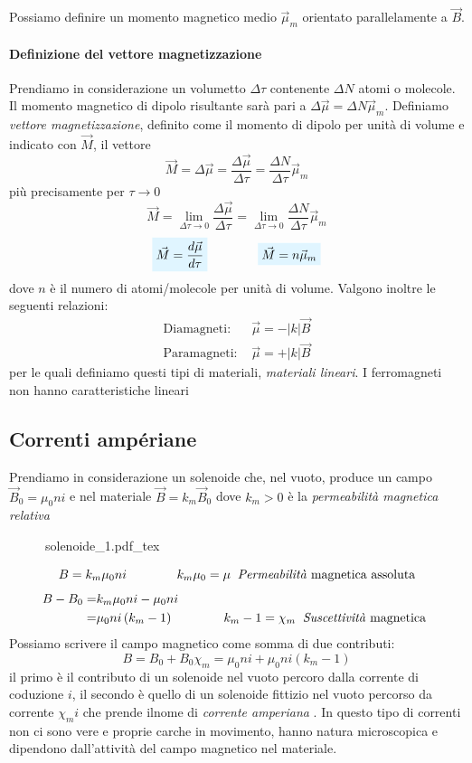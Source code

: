 \documentclass[x11names]{report}
\newcommand{\incfig}[1]{%
	{#1.pdf_tex}
}
\newcommand{\viola}[1]{%
	\colorbox{myblue}{$\displaystyle #1$}
}
\begin{document}
Possiamo definire un momento magnetico medio \(\vec{\mu}_m\) orientato parallelamente a \(\vec{B}\).

\paragraph{Definizione del vettore magnetizzazione}
Prendiamo in considerazione un volumetto \(\Delta\tau\) contenente \(\Delta N\) atomi o molecole. Il momento magnetico di dipolo risultante sarà pari a \(\Delta\vec{\mu} = \Delta N \vec{\mu}_m\). Definiamo \textit{vettore magnetizzazione}, definito come il momento di dipolo per unità di volume e indicato con \(\vec{M}\), il vettore
\[
\vec{M} = \Delta\vec{\mu} = \frac{\Delta \vec{\mu}}{\Delta\tau} =\frac{\Delta N}{\Delta\tau} \vec{\mu}_m
\]
più precisamente per \(\tau \to 0\)
\[
\vec{M} = \lim_{\Delta\tau \to 0}\frac{\Delta \vec{\mu}}{\Delta\tau} = \lim_{\Delta\tau \to 0}\frac{\Delta N}{\Delta\tau} \vec{\mu}_m
\]
\begin{equation}
	\viola{\vec{M}= \frac{d \vec{\mu}}{d\tau}} \qquad \qquad	\viola{\vec{M} = n\vec{\mu}_m}
\end{equation}
dove \(n\) è il numero di atomi/molecole per unità di volume. Valgono inoltre le seguenti relazioni:
\[
\begin{array}{rc}
	\text{Diamagneti: } & \vec{\mu} = - |k| \vec{B} \\
	\text{Paramagneti: } & \vec{\mu} = + |k| \vec{B}
\end{array}
\]
per le quali definiamo questi tipi di materiali, \textit{materiali lineari}. I ferromagneti non hanno caratteristiche lineari

\subsection{Correnti ampériane}
Prendiamo in considerazione un solenoide che, nel vuoto, produce un campo \(\vec{B}_0 = \mu_0 n i\) e nel materiale \(\vec{B} = k_m\vec{B}_0\) dove \(k_m > 0\) è la \textit{permeabilità magnetica relativa}

\begin{figure}[H]
	\centering
	\incfig{solenoide_1}
\end{figure}
\[
B = k_m \mu_0 n i \qquad \qquad k_m\mu_0 = \mu \: \text{ \textit{Permeabilità} magnetica assoluta} 
\]
\begin{align*}
	B - B_0 =&  k_m \mu_0 n i - \mu_0 n i \\
			=& \mu_0 n i\left(k_m -1\right) \qquad \qquad k_m - 1= \chi_m \: \text{ \textit{Suscettività} magnetica } \\
\end{align*}
Possiamo scrivere il campo magnetico come somma di due contributi:
\[
B = B_0  + B_0\chi_m = \mu_0 n i + \mu_0 n i\left(k_m -1\right)
\]
il primo è il contributo di un solenoide nel vuoto percoro dalla corrente di coduzione \(i\), il secondo è quello di un solenoide fittizio nel vuoto percorso da corrente \(\chi_m i\) che prende ilnome di \textit{corrente amperiana}	. In questo tipo di correnti non ci sono vere e proprie carche in movimento, hanno natura microscopica e dipendono dall'attività del campo magnetico nel materiale.
\end{document}
